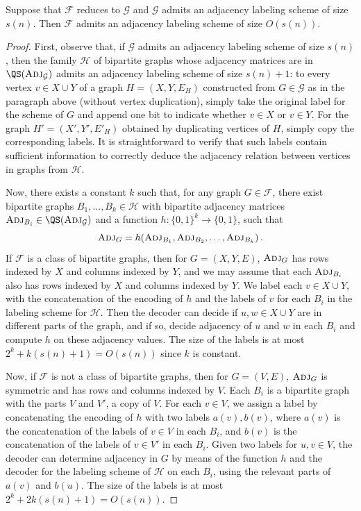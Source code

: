 \documentclass{article}
\newcommand{\zo}{\{0,1\}}
\newcommand{\cF}{\ensuremath{\mathcal{F}}}
\newcommand{\cG}{\ensuremath{\mathcal{G}}}
\newcommand{\cH}{\ensuremath{\mathcal{H}}}
\newcommand{\Adj}{\textsc{Adj}}
\begin{document}
\begin{proposition}
Suppose that $\cF$ reduces to $\cG$ and $\cG$ admits an adjacency labeling scheme of size $s(n)$.
Then $\cF$ admits an adjacency labeling scheme of size $O(s(n))$.
\end{proposition}
\begin{proof}
First, observe that, if $\cG$ admits an adjacency labeling scheme of size $s(n)$, then the family
$\cH$ of bipartite graphs whose adjacency matrices are in $\QS(\Adj_\cG)$ admits an adjacency labeling
scheme of size $s(n) + 1$: to every vertex $v \in X \cup Y$ of a graph $H = (X, Y, E_H)$ constructed
from $G \in \cG$ as in the paragraph above (without vertex duplication), simply take the original label
for the scheme of $G$ and append one bit to indicate whether $v \in X$ or $v \in Y$. For the graph
$H' = (X',Y',E'_H)$ obtained by duplicating vertices of $H$, simply copy the corresponding labels. It is
straightforward to verify that such labels contain sufficient information to correctly deduce the adjacency 
relation between vertices in graphs from $\cH$.

Now, there exists a constant $k$ such that, for any graph $G \in \cF$, there exist bipartite graphs
$B_1, \dotsc, B_k \in \cH$ with bipartite adjacency matrices $\Adj_{B_i} \in \QS(\Adj_\cG)$ and a
function $h : \zo^k \to \zo$, such that
\[
  \Adj_G = h(\Adj_{B_1}, \Adj_{B_2}, \dotsc, \Adj_{B_k}) \,.
\]
If $\cF$ is a class of bipartite graphs, then for $G = (X,Y,E)$, $\Adj_G$ has rows indexed by $X$ and columns indexed by $Y$, and we may assume that each $\Adj_{B_i}$ also
has rows indexed by $X$ and columns indexed by $Y$. We label each $v \in X \cup Y$, with the
concatenation of the encoding of $h$ and the labels of $v$ for each $B_i$ in the labeling scheme for
$\cH$.  Then the decoder can decide if $u,w \in X \cup Y$ are in different parts of the graph, and
if so, decide adjacency of $u$ and $w$ in each $B_i$ and compute $h$ on these adjacency values. The
size of the labels is at most $2^k + k(s(n)+1) = O(s(n))$ since $k$ is constant.

Now, if $\cF$ is not a class of bipartite graphs, then for $G = (V,E)$, $\Adj_G$ is symmetric and has
rows and columns indexed by $V$. Each $B_i$ is a bipartite graph with the parts $V$ and
$V'$, a copy of $V$. For each $v \in V$, we assign a label by concatenating the encoding of $h$ with two labels $a(v), b(v)$, where $a(v)$ is the concatenation of the labels of $v \in V$ in each $B_i$, and $b(v)$ is the concatenation of the labels of $v \in V'$ in each $B_i$. 
Given two labels for $u,v \in V$, the decoder can determine adjacency in $G$
by means of the function $h$ and the decoder for the labeling scheme of $\cH$ on each $B_i$, using the relevant parts of $a(v)$ and $b(u)$. The size of the labels is at most $2^k + 2k(s(n)+1)= O(s(n))$.
\end{proof}
\end{document}
